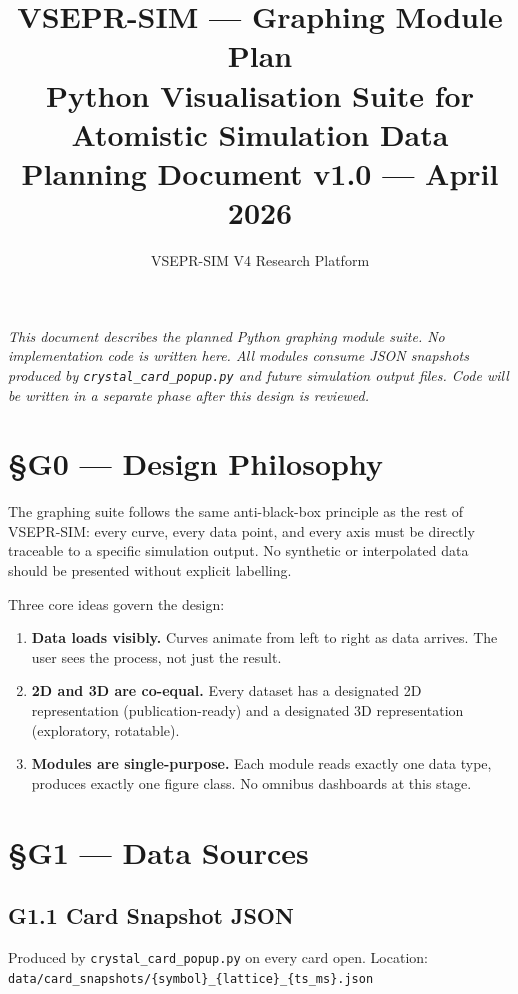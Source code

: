 \documentclass[11pt,a4paper]{article}
\title{\textbf{VSEPR-SIM --- Graphing Module Plan}\\
       \large Python Visualisation Suite for Atomistic Simulation Data\\[0.4em]
       \normalsize\color{dim}Planning Document v1.0 --- April 2026}
\author{VSEPR-SIM V4 Research Platform}
\date{}
\begin{document}
\maketitle
\tableofcontents
\vspace{1em}
{\small\itshape\color{dim}%
This document describes the planned Python graphing module suite.
No implementation code is written here.
All modules consume JSON snapshots produced by \texttt{crystal\_card\_popup.py}
and future simulation output files.
Code will be written in a separate phase after this design is reviewed.}

\section{\S{}G0 --- Design Philosophy}

The graphing suite follows the same anti-black-box principle as the rest of
VSEPR-SIM\@: every curve, every data point, and every axis must be directly
traceable to a specific simulation output.
No synthetic or interpolated data should be presented without explicit labelling.

Three core ideas govern the design:

\begin{enumerate}[leftmargin=2em]
  \item \textbf{Data loads visibly.}
        Curves animate from left to right as data arrives.
        The user sees the process, not just the result.
  \item \textbf{2D and 3D are co-equal.}
        Every dataset has a designated 2D representation (publication-ready)
        and a designated 3D representation (exploratory, rotatable).
  \item \textbf{Modules are single-purpose.}
        Each module reads exactly one data type, produces exactly one figure class.
        No omnibus dashboards at this stage.
\end{enumerate}

\section{\S{}G1 --- Data Sources}

\subsection{G1.1 Card Snapshot JSON}
Produced by \texttt{crystal\_card\_popup.py} on every card open.
Location: \texttt{data/card\_snapshots/\{symbol\}\_\{lattice\}\_\{ts\_ms\}.json}
\end{document}
